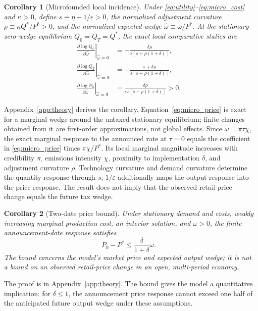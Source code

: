 \documentclass[11pt]{article}
\newtheorem{corollary}{Corollary}
\begin{document}
\begin{corollary}[Microfounded local incidence]\label{cor:microfoundation}
Under \eqref{eq:utility}--\eqref{eq:micro_cost} and $\kappa>0$, define $s\equiv\eta+1/\varepsilon>0$, the normalized adjustment curvature $\rho\equiv\kappa Q^*/P^*>0$, and the normalized expected wedge $\widehat{\omega}\equiv\omega/P^*$. At the stationary zero-wedge equilibrium $Q_0=Q_T=Q^*$, the exact local comparative statics are
\begin{align}
\left.\frac{\partial\log Q_0}{\partial\widehat{\omega}}\right|_{\widehat{\omega}=0}
&=-\frac{\delta\rho}{s[s+\rho(1+\delta)]},\label{eq:micro_q0}\\
\left.\frac{\partial\log Q_T}{\partial\widehat{\omega}}\right|_{\widehat{\omega}=0}
&=-\frac{s+\delta\rho}{s[s+\rho(1+\delta)]},\label{eq:micro_qt}\\
\left.\frac{\partial\log P_0}{\partial\widehat{\omega}}\right|_{\widehat{\omega}=0}
&=\frac{\delta\rho}{\varepsilon s[s+\rho(1+\delta)]}>0.\label{eq:micro_price}
\end{align}
\end{corollary}

Appendix~\ref{app:theory} derives the corollary. Equation~\eqref{eq:micro_price} is exact for a marginal wedge around the untaxed stationary equilibrium; finite changes obtained from it are first-order approximations, not global effects. Since $\omega=\pi\tau\chi$, the exact marginal response to the announced rate at $\tau=0$ equals the coefficient in \eqref{eq:micro_price} times $\pi\chi/P^*$. Its local marginal magnitude increases with credibility $\pi$, emissions intensity $\chi$, proximity to implementation $\delta$, and adjustment curvature $\rho$. Technology curvature and demand curvature determine the quantity response through $s$; $1/\varepsilon$ additionally maps the output response into the price response. The result does not imply that the observed retail-price change equals the future tax wedge.

\begin{corollary}[Two-date price bound]\label{cor:price_bound}
Under stationary demand and costs, weakly increasing marginal production cost, an interior solution, and $\omega>0$, the finite announcement-date response satisfies
\begin{equation}\label{eq:price_bound}
P_0-P^*\leq\frac{\delta}{1+\delta}\omega.
\end{equation}
The bound concerns the model's market price and expected output wedge; it is not a bound on an observed retail-price change in an open, multi-period economy.
\end{corollary}
The proof is in Appendix~\ref{app:theory}. The bound gives the model a quantitative implication: for $\delta\leq1$, the announcement price response cannot exceed one half of the anticipated future output wedge under these assumptions.
\end{document}
